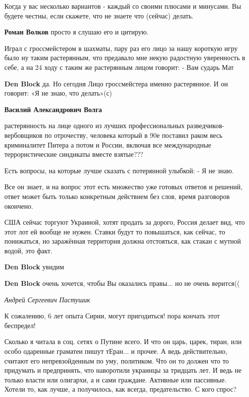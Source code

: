 \begin{itemize}
Когда у вас несколько вариантов - каждый со своими плюсами и минусами. Вы
будете честны, если скажете, что не знаете что (сейчас) делать.

\begin{itemize} %
\textbf{Роман Волков} просто я слушаю его и цитирую.
\end{itemize} %


Играл с гроссмейстером в шахматы, пару раз его лицо за нашу короткую игру было
ну таким растерянным, что предавало мне некую радостную уверенность в себе, а
на 24 ходу с таким же растерянным лицом говорит: - Вам сударь Мат

\begin{itemize} %
\textbf{Den Block} да. Но сегодня Лицо гроссмейстера именно растерянное. И он говорит: «Я не знаю, что делать»(с)

\textbf{Василий Александрович Волга} 

растерянность на лице одного из лучших профессиональных разведчиков-вербовщиков
по отрочеству, человека который в 90е поставил раком весь криминалитет Питера а
потом и России, включая все международные террористические синдикаты вместе
взятые???

Есть вопросы, на которые лучше сказать с потерянной улыбкой: - Я не знаю.

Все он знает, и на вопрос этот есть множество уже готовых ответов и решений,
ответ может быть только конкретным действием без слов, время разговоров
окончено.

США сейчас торгуют Украиной, хотят продать за дорого, Россия делает вид, что
этот лот ей вообще не нужен. Ставки будут то повышаться, как сейчас, то
понижаться, но заражённая территория должна отстояться, как стакан с мутной
водой, это факт.


\textbf{Den Block} увидим

\textbf{Den Block} очень хочется, чтобы Вы оказались правы... но не очень верится((
\end{itemize} %

\emph{Андрей Сергеевич Пастушик}

К сожалению, 6 лет опыта Сирии, могут пригодиться! пора кончать этот беспредел!


Сколько я читала в соц. сетях о Путине всего. И что он царь, царек, тиран, или
особо одаренные граматеи пишут тЕран... и прочее. А ведь действительно, считают
его непревзойденным по уму, политиком. Что он то должен что то придумать и
предпринять, что наворотили украинцы за тридцать лет. И ведь не только власти
или олигархи, а и сами граждане. Активные или пассивные. Хотели то, как лучше,
а получилось, как всегда, предательство. С кого спрос?


\end{itemize}
